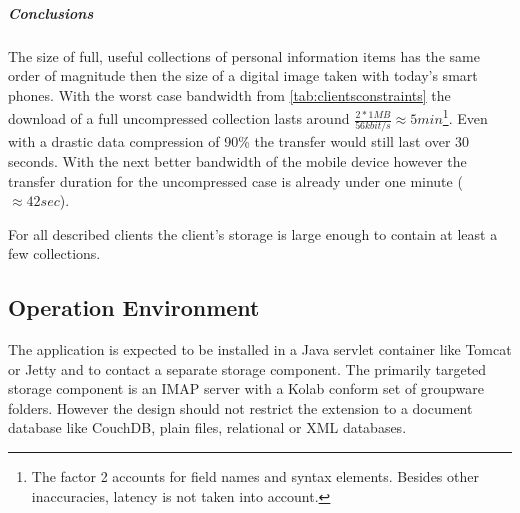 \documentclass[12pt,a4paper,twoside]{scrartcl}		%
\begin{document}
\subparagraph{Conclusions} The size of full, useful collections of personal
information items has the same order of magnitude then the size of a digital
image taken with today's smart phones. With the worst case bandwidth from
\autoref{tab:clientsconstraints} the download of a full uncompressed collection
lasts around $\frac{2 * 1MB}{56kbit/s} \approx 5min$\footnote{The factor 2
  accounts for field names and syntax elements. Besides other inaccuracies,
  latency is not taken into account.}. Even with a drastic data compression of
90\% the transfer would still last over 30 seconds. With the next better
bandwidth of the mobile device however the transfer duration for the
uncompressed case is already under one minute ($\approx 42 sec$).

For all described clients the client's storage is large enough to contain at
least a few collections.

\subsection{Operation Environment}

The application is expected to be installed in a Java servlet container like
Tomcat or Jetty and to contact a separate storage component. The primarily
targeted storage component is an IMAP server with a Kolab conform set of
groupware folders. However the design should not restrict the extension to a
document database like CouchDB, plain files, relational or XML databases.




\end{document}
